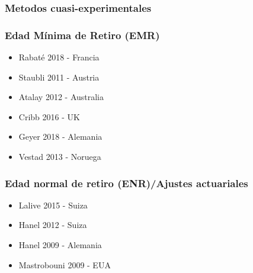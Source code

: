 \documentclass{beamer}
\begin{document}
\frame
{
  \frametitle{Metodos cuasi-experimentales}
  
}
\frame
{
  \frametitle{Edad Mínima de Retiro (EMR)}

    \begin{itemize}
    \item Rabaté 2018 - Francia
    \item Staubli 2011 - Austria
    \item Atalay 2012 - Australia
    \item Cribb 2016 - UK
    \item Geyer 2018 - Alemania
    \item Vestad 2013 - Noruega
    \end{itemize}
}
  \frame
  {
    \frametitle{Edad normal de retiro (ENR)/Ajustes actuariales}
    \begin{itemize}
    \item Lalive 2015 - Suiza
    \item Hanel 2012 - Suiza
    \item Hanel 2009 - Alemania
    \item Mastrobouni 2009 - EUA
    \end{itemize}
  }
\end{document}
